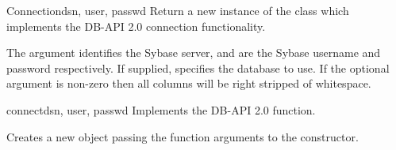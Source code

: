 \begin{classdesc}{Connection}{dsn, user, passwd  }
Return a new instance of the  class which implements
the DB-API 2.0 connection functionality.

The  argument identifies the Sybase server,  and
 are the Sybase username and password respectively.  If
supplied,  specifies the database to use.  If the
optional  argument is non-zero then all  columns
will be right stripped of whitespace.
\end{classdesc}

\begin{funcdesc}{connect}{dsn, user, passwd  }
Implements the DB-API 2.0  function.

Creates a new  object passing the function arguments
to the  constructor.
\end{funcdesc}

